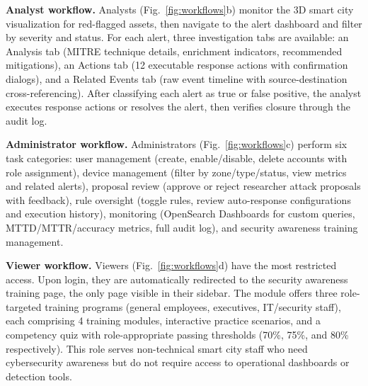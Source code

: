 \documentclass[conference,10pt]{IEEEtran}
\begin{document}
\textbf{Analyst workflow.} Analysts (Fig.~\ref{fig:workflows}b) monitor the 3D smart city visualization for red-flagged assets, then navigate to the alert dashboard and filter by severity and status. For each alert, three investigation tabs are available: an Analysis tab (MITRE technique details, enrichment indicators, recommended mitigations), an Actions tab (12 executable response actions with confirmation dialogs), and a Related Events tab (raw event timeline with source-destination cross-referencing). After classifying each alert as true or false positive, the analyst executes response actions or resolves the alert, then verifies closure through the audit log.

\textbf{Administrator workflow.} Administrators (Fig.~\ref{fig:workflows}c) perform six task categories: user management (create, enable/disable, delete accounts with role assignment), device management (filter by zone/type/status, view metrics and related alerts), proposal review (approve or reject researcher attack proposals with feedback), rule oversight (toggle rules, review auto-response configurations and execution history), monitoring (OpenSearch Dashboards for custom queries, MTTD/MTTR/accuracy metrics, full audit log), and security awareness training management.

\textbf{Viewer workflow.} Viewers (Fig.~\ref{fig:workflows}d) have the most restricted access. Upon login, they are automatically redirected to the security awareness training page, the only page visible in their sidebar. The module offers three role-targeted training programs (general employees, executives, IT/security staff), each comprising 4 training modules, interactive practice scenarios, and a competency quiz with role-appropriate passing thresholds (70\%, 75\%, and 80\% respectively). This role serves non-technical smart city staff who need cybersecurity awareness but do not require access to operational dashboards or detection tools.
\end{document}
